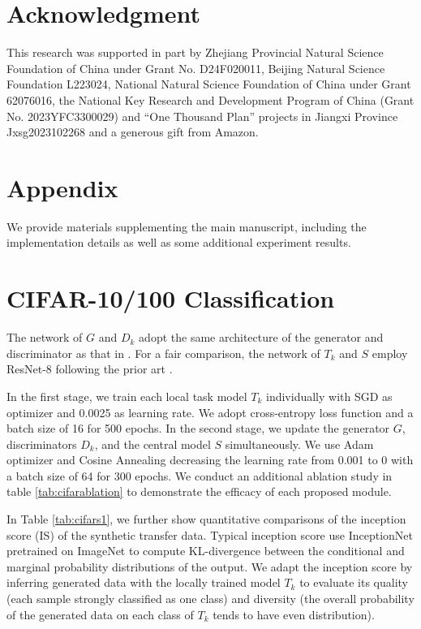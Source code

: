 \documentclass[letterpaper]{article} %
\begin{document}
\section{Acknowledgment}
This research was supported in part by Zhejiang Provincial Natural Science Foundation of China under Grant No. D24F020011, Beijing Natural Science Foundation L223024, National Natural Science Foundation of China under Grant 62076016, the National Key Research and Development Program of China (Grant No. 2023YFC3300029) and “One Thousand Plan” projects in Jiangxi Province Jxsg2023102268 and a generous gift from Amazon.








\newpage

\section*{\LARGE\textbf Appendix}

We provide materials supplementing the main manuscript, including the implementation details as well as some additional experiment results. %

\section{CIFAR-10/100 Classification}
The network of $G$ and $D_k$ adopt the same architecture of the generator and discriminator as that in \cite{fang2021mosaicking}. For a fair comparison, the network of $T_k$ and $S$ employ ResNet-8 following the prior art \cite{lin2020ensemble}. 

In the first stage, we train each local task model $T_k$ individually with SGD as optimizer and 0.0025 as learning rate. We adopt cross-entropy loss function and a batch size of 16 for 500 epochs. 
In the second stage, we update the generator $G$, discriminators $D_k$, and the central model $S$ simultaneously. We use Adam optimizer and Cosine Annealing decreasing the learning rate from 0.001 to 0 with a batch size of 64 for 300 epochs. We conduct an additional ablation study in table \ref{tab:cifarablation} to demonstrate the efficacy of each proposed module. 

In Table \ref{tab:cifars1}, we further show quantitative comparisons of the inception score (IS) of the synthetic transfer data. Typical inception score use InceptionNet \cite{szegedy2017inception} pretrained on ImageNet\cite{deng2009imagenet} to compute KL-divergence between the conditional and marginal probability distributions of the output. We adapt the inception score by inferring generated data with the locally trained model $T_k$ to evaluate its quality (each sample strongly classified as one class) and diversity (the overall probability of the generated data on each class of  $T_k$ tends to have even distribution). 
\end{document}
